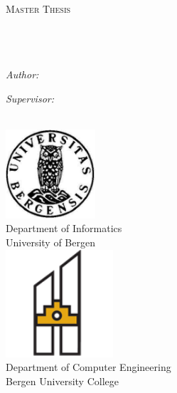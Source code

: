 \documentclass[11pt, a4paper, oneside]{Thesis} %
\begin{document}
\begin{titlepage}
\begin{center}

\textsc{\LARGE \univname}\\[1.5cm] %
\textsc{\Large Master Thesis}\\[0.5cm] %

\HRule \\[0.4cm] %
{\huge \bfseries \ttitle}\\[0.0cm] %
\HRule \\[1.2cm] %
 
 
\begin{minipage}{0.4\textwidth}
\begin{flushleft} \large
\emph{Author:}\\ {\authornames} %
\end{flushleft}
\end{minipage}
\begin{minipage}{0.4\textwidth}
\begin{flushright} \large
\emph{Supervisor:} \\ {\supname} %
\end{flushright}
\end{minipage}\\[1.5cm]

\includegraphics[width=0.25\textwidth]{Figures/uib_logo.png}\\
{\normalsize Department of Informatics}\\
{\normalsize University of Bergen}\\[1cm]

\includegraphics[width=0.3\textwidth]{Figures/hib_logo.png}\\
{\normalsize Department of Computer Engineering}\\
{\normalsize Bergen University College}\\[1cm]
 

\end{center}
\end{titlepage}
\end{document}
